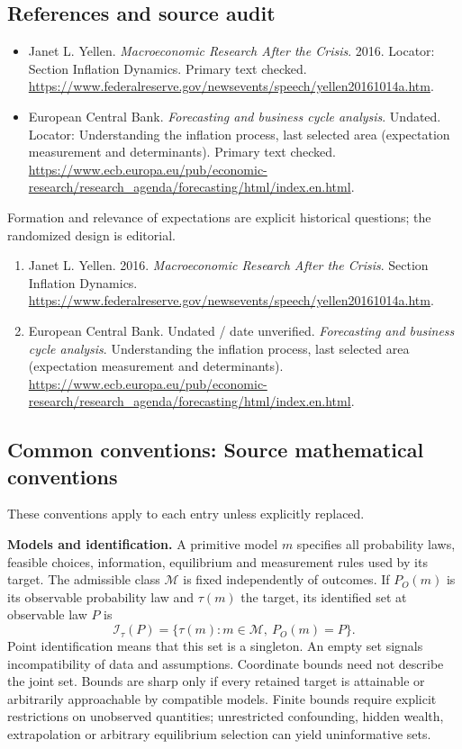 \documentclass[11pt,a4paper]{article}
\begin{document}
\subsection*{References and source audit}
\begin{itemize}
\item Janet L. Yellen. \emph{Macroeconomic Research After the Crisis}. 2016. Locator: Section Inflation Dynamics. Primary text checked. \url{https://www.federalreserve.gov/newsevents/speech/yellen20161014a.htm}.
\item European Central Bank. \emph{Forecasting and business cycle analysis}. Undated. Locator: Understanding the inflation process, last selected area (expectation measurement and determinants). Primary text checked. \url{https://www.ecb.europa.eu/pub/economic-research/research_agenda/forecasting/html/index.en.html}.
\end{itemize}
Formation and relevance of expectations are explicit historical questions; the randomized design is editorial.
\begin{enumerate}\raggedright
\item\hypertarget{definitions:source:30007524:1}{} Janet L. Yellen. 2016. \emph{Macroeconomic Research After the Crisis}. Section Inflation Dynamics.
\url{https://www.federalreserve.gov/newsevents/speech/yellen20161014a.htm}.
\item\hypertarget{definitions:source:30007524:2}{} European Central Bank. Undated / date unverified. \emph{Forecasting and business cycle analysis}. Understanding the inflation process, last selected area (expectation measurement and determinants).
\url{https://www.ecb.europa.eu/pub/economic-research/research_agenda/forecasting/html/index.en.html}.
\end{enumerate}

\subsection*{Common conventions: Source mathematical conventions}

These conventions apply to each entry unless explicitly replaced.

\textbf{Models and identification.} A primitive model \(m\) specifies all probability laws, feasible choices, information, equilibrium and measurement rules used by its target. The admissible class \(\mathcal M\) is fixed independently of outcomes. If \(P_O(m)\) is its observable probability law and \(\tau(m)\) the target, its identified set at observable law \(P\) is
\[
 \mathcal I_\tau(P)=\{\tau(m):m\in\mathcal M,\ P_O(m)=P\}.
\]
Point identification means that this set is a singleton. An empty set signals incompatibility of data and assumptions. Coordinate bounds need not describe the joint set. Bounds are sharp only if every retained target is attainable or arbitrarily approachable by compatible models. Finite bounds require explicit restrictions on unobserved quantities; unrestricted confounding, hidden wealth, extrapolation or arbitrary equilibrium selection can yield uninformative sets.
\end{document}
